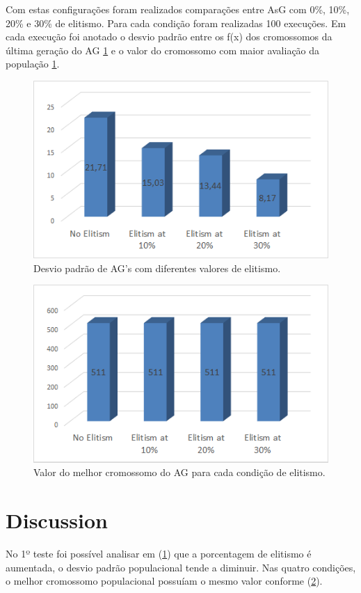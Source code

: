 \documentclass[twoside]{article}
\begin{document}
\begin{multicols}{2}
Com estas configurações foram realizados comparações entre AsG com 0\%, 10\%, 20\% e 30\% de elitismo. Para cada condição foram realizadas 100 execuções. Em cada execução foi anotado o desvio padrão entre os f(x) dos cromossomos da última geração do AG  \ref{fig:devpadelit} e o valor do cromossomo com maior avaliação da população \ref{fig:devpadelit}.

\begin{figure}[H]
\label{fig:devpadelit}
  \caption{Desvio padrão de AG's com diferentes valores de elitismo.}
  \centering
    \includegraphics[scale = 0.47]{elitism_analysis.png}
\end{figure}

\begin{figure}[H]
\label{fig:devpadelit2}
  \caption{Valor do melhor cromossomo do AG para cada condição de elitismo.}
  \centering
    \includegraphics[scale = 0.47]{elitism_analysis1.png}
\end{figure}

\section{Discussion}
No 1º teste foi possível analisar em (\ref{fig:devpadelit}) que a porcentagem de elitismo é aumentada, o desvio padrão populacional tende a diminuir. Nas quatro condições, o melhor cromossomo populacional possuíam o mesmo valor conforme (\ref{fig:devpadelit2}).


\end{multicols}
\end{document}
